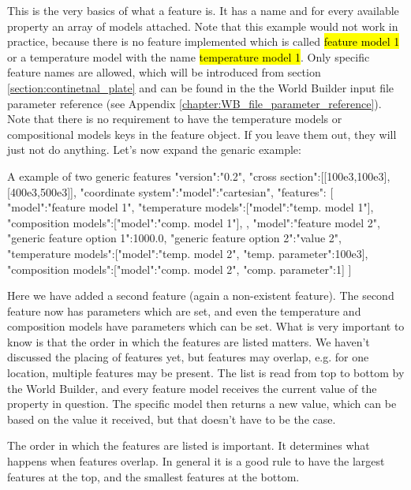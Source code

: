 \documentclass{book}
\newcommand{\WB}{{World Builder}}
\begin{document}
This is the very basics of what a feature is. It has a name and for every available property an array of models attached. Note that this example would not work in practice, because there is no feature implemented which is called \hl{feature model 1} or a temperature model with the name \hl{temperature model 1}. Only specific feature names are allowed, which will be introduced from section \ref{section:continetnal_plate} and can be found in the the \WB{} input file parameter reference (see Appendix \ref{chapter:WB_file_parameter_reference}). Note that there is no requirement to have the temperature models or compositional models keys in the feature object. If you leave them out, they will just not do anything. Let's now expand the genaric example:

\begin{javascriptcode}{A example of two generic features}{}
{
  "version":"0.2",
  "cross section":[[100e3,100e3],[400e3,500e3]],
  "coordinate system":{"model":"cartesian"},
  "features":
  [
    {
      "model":"feature model 1",
      "temperature models":[{"model":"temp. model 1"}],
      "composition models":[{"model":"comp. model 1"}],
    },
    {
      "model":"feature model 2",
      "generic feature option 1":1000.0,
      "generic feature option 2":"value 2",
      "temperature models":[{"model":"temp. model 2", "temp. parameter":100e3}],
      "composition models":[{"model":"comp. model 2", "comp. parameter":1}]
    }
  ]
}
\end{javascriptcode}

Here we have added a second feature (again a non-existent feature). The second feature now has parameters which are set, and even the temperature and composition models have parameters which can be set. What is very important to know is that the order in which the features are listed matters. We haven't discussed the placing of features yet, but features may overlap, e.g. for one location, multiple features may be present. The list is read from top to bottom by the \WB{}, and every feature model receives the current value of the property in question. The specific model then returns a new value, which can be based on the value it received, but that doesn't have to be the case. 

\begin{remark}
The order in which the features are listed is important. It determines what happens when features overlap. In general it is a good rule to have the largest features at the top, and the smallest features at the bottom.
\end{remark}
\end{document}
